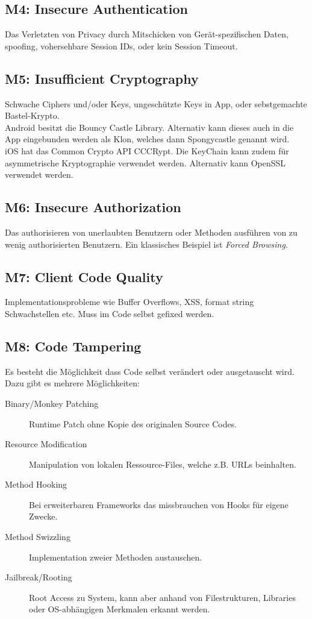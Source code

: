 \subsection{M4: Insecure Authentication}
Das Verletzten von Privacy durch Mitschicken von Gerät-spezifischen Daten, spoofing, vohersehbare Session IDs, oder kein Session Timeout.

\subsection{M5: Insufficient Cryptography}
Schwache Ciphers und/oder Keys, ungeschützte Keys in App, oder sebstgemachte Bastel-Krypto.\\

Android besitzt die Bouncy Castle Library. Alternativ kann dieses auch in die App eingebunden werden als Klon, welches dann Spongycastle genannt wird.\\

iOS hat das Common Crypto API CCCRypt. Die KeyChain kann zudem für asymmetrische Kryptographie verwendet werden. Alternativ kann OpenSSL verwendet werden.

\subsection{M6: Insecure Authorization}
Das authorisieren von unerlaubten Benutzern oder Methoden ausführen von zu wenig authorisierten Benutzern. Ein klassisches Beispiel ist \textit{Forced Browsing}.

\subsection{M7: Client Code Quality}
Implementationsprobleme wie Buffer Overflows, XSS, format string Schwachstellen etc. Muss im Code selbst gefixed werden.

\subsection{M8: Code Tampering}
Es besteht die Möglichkeit dass Code selbst verändert oder ausgetauscht wird. Dazu gibt es mehrere Möglichkeiten:

\begin{description}
	\item[Binary/Monkey Patching] Runtime Patch ohne Kopie des originalen Source Codes.
	\item[Resource Modification] Manipulation von lokalen Ressource-Files, welche z.B. URLs beinhalten.
	\item[Method Hooking] Bei erweiterbaren Frameworks das missbrauchen von Hooks für eigene Zwecke.
	\item[Method Swizzling] Implementation zweier Methoden austauschen.
	\item[Jailbreak/Rooting] Root Access zu System, kann aber anhand von Filestrukturen, Libraries oder OS-abhängigen Merkmalen erkannt werden.
\end{description}

